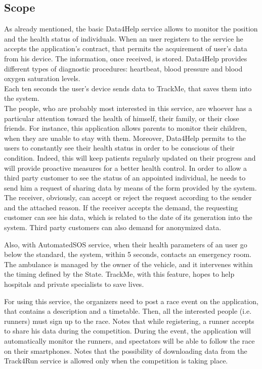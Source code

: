 \subsection{Scope}
As already mentioned, the basic Data4Help service allows to monitor the position and the health status of individuals. When an user registers to the service he accepts the application's contract, that permits the acquirement of user's data from his device. The information, once received, is stored. Data4Help provides different types of diagnostic procedures:  heartbeat, blood pressure and blood oxygen saturation levels.\\ 
Each ten seconds the user's device sends data to TrackMe, that saves them into the system. \\ 
The people, who are probably most interested in this service, are whoever has a particular attention toward the health of himself, their family, or their close friends.
For instance, this application allows parents to monitor their children, when they are unable to stay with them. 
Moreover, Data4Help permits to the users to constantly see their health status in order to be conscious of their condition. Indeed, this will keep patients regularly updated on their progress and will provide proactive measures for a better health control. 
In order to allow a third party customer to see the status of an appointed individual, he needs to send him a request of sharing data by means of the form provided by the system. 
The receiver, obviously, can accept or reject the request according to the sender and the attached reason. 
If the receiver accepts the demand, the requesting customer can see his data, which is related to the date of its generation into the system. Third party customers can also demand for anonymized data. \\ 

\par
Also, with AutomatedSOS service, when their health parameters of an user go below the standard, the system, within 5 seconds, contacts an emergency room.
The ambulance is managed by the owner of the vehicle, and it intervenes within the timing defined by the State.
TrackMe, with this feature, hopes to help hospitals and private specialists to save lives.

\par
For using this service, the organizers need to post a race event on the application, that contains a description and a timetable. 
Then, all the interested people (i.e. runners) must sign up to the race.
Notes that while registering, a runner accepts to share his data during the competition. 
During the event, the application will automatically monitor the runners, and spectators will be able to follow the race on their smartphones. 
Notes that the possibility of downloading data from the Track4Run service is allowed only when the competition is taking place. \\

